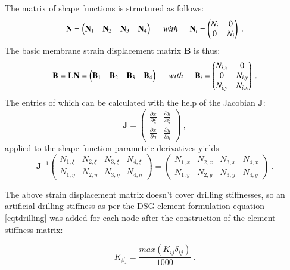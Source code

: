 The matrix of shape functions is structured as follows:
\begin{equation}
\mathbf{N}=  \begin{pmatrix}
\mathbf{N}_1 & \mathbf{N}_2 & \mathbf{N}_3 & \mathbf{N}_4
\end{pmatrix}
\hspace{5mm}
with
\hspace{5mm}
\mathbf{N}_i=  \begin{pmatrix}
{N}_i & 0\\
0& N_i
\end{pmatrix}
\label{eqApp1_4}\ .
\end{equation}
The basic membrane strain displacement matrix $\mathbf{B}$ is thus:
\begin{equation}
\mathbf{B}=  \mathbf{L} \mathbf{N} = \begin{pmatrix}
\mathbf{B}_1 & \mathbf{B}_2 & \mathbf{B}_3 & \mathbf{B}_4
\end{pmatrix}
\hspace{5mm}
with
\hspace{5mm}
\mathbf{B}_i=  \begin{pmatrix}
{N}_{i,x} & 0\\
0& {N}_{i,y}\\
{N}_{i,y} & {N}_{i,x}
\end{pmatrix}
\label{eqApp1_5}\ .
\end{equation}
The entries of which can be calculated with the help of the Jacobian $\mathbf{J}$:
\begin{equation}
\mathbf{J}=  \begin{pmatrix}
\frac{\partial x}{\partial \xi} & \frac{\partial y}{\partial \xi} \\
\frac{\partial x}{\partial \eta} & \frac{\partial y}{\partial \eta}
\end{pmatrix}
\label{eqApp1_6}\ ,
\end{equation}
applied to the shape function parametric derivatives yields
\begin{equation}
\mathbf{J}^{-1} 
\begin{pmatrix}
{N}_{1,\xi} & {N}_{2,\xi} & {N}_{3,\xi} & {N}_{4,\xi}\\
{N}_{1,\eta} & {N}_{2,\eta} & {N}_{3,\eta} & {N}_{4,\eta}
\end{pmatrix}
=
\begin{pmatrix}
{N}_{1,x} & {N}_{2,x} & {N}_{3,x} & {N}_{4,x}\\
{N}_{1,y} & {N}_{2,y} & {N}_{3,y} & {N}_{4,y}
\end{pmatrix}
\label{eqApp1_7}\ .
\end{equation}

The above strain displacement matrix doesn't cover drilling stiffnesses, so an artificial drilling stiffness as per the DSG element formulation equation \ref{eqtdrilling} was added for each node after the construction of the element stiffness matrix:

\begin{equation} 
K_{\beta_z} =  \frac{max(K_{ij}\delta_{ij})}{1000}
\label{eqtdrilling1}\ .
\end{equation}